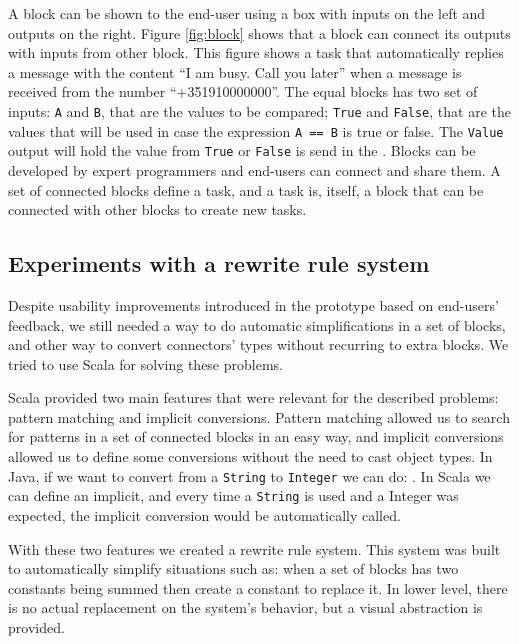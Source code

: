 \documentclass[9pt,a4paper]{extarticle}
\begin{document}
\begin{multicols}{2}
A block can be shown to the end-user using a box with inputs on the left and outputs on the right. 
Figure \ref{fig:block} shows that a block can connect its outputs with inputs from other block. This figure shows a task that automatically replies a message with the content ``I am busy. Call you later'' when a message is received from the number ``+351910000000''. The equal blocks has two set of inputs: \texttt{A} and  \texttt{B}, that are the values to be compared; \texttt{True} and  \texttt{False}, that are the values that will be used in case the expression \texttt{A == B} is true or false. The \texttt{Value} output will hold the value from \texttt{True} or \texttt{False} is send in the . Blocks can be developed by expert programmers and end-users can connect and share them. A set of connected blocks define a task, and a task is, itself, a block that can be connected with other blocks to create new tasks.

\subsection{Experiments with a rewrite rule system}

Despite usability improvements introduced in the prototype based on end-users' feedback, we still needed a way to do automatic simplifications in a set of blocks, and other way to convert connectors' types without recurring
to extra blocks. We tried to use Scala for solving these problems.

Scala provided two main features that were relevant for the described problems: pattern matching and implicit conversions. Pattern matching allowed us to search for patterns in a set of connected blocks in an easy way, and implicit conversions allowed us to define some conversions without the need to cast object types. In Java, if we want to convert from a \texttt{String} to \texttt{Integer} we can do: . In Scala we can define an implicit,
and every time a \texttt{String} is used and a Integer was expected, the implicit conversion would be automatically called.


With these two features we created a rewrite rule system. This system was built to automatically simplify situations such as: when a set of blocks has two constants being summed then create a constant to replace it. In lower level, there is no actual replacement on the system's behavior, but a visual abstraction is provided. 


\end{multicols}
\end{document}
